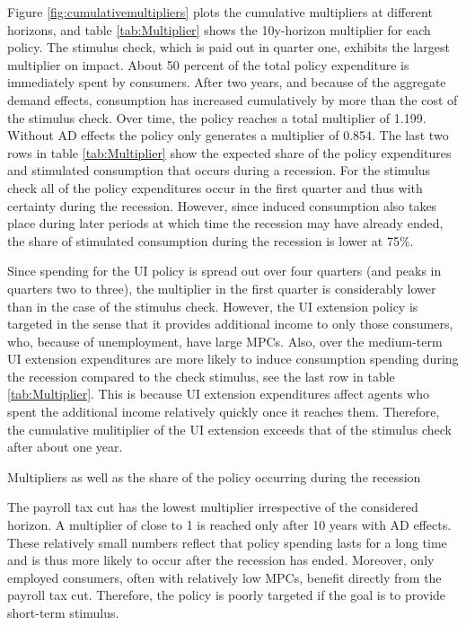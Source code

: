 \documentclass[\econtexRoot/HAFiscal]{subfiles}
\begin{document}
Figure \ref{fig:cumulativemultipliers} plots the cumulative multipliers at different horizons, and table \ref{tab:Multiplier} shows the 10y-horizon multiplier for each policy. The stimulus check, which is paid out in quarter one, exhibits the largest multiplier on impact. About 50 percent of the total policy expenditure is immediately spent by consumers. After two years, and because of the aggregate demand effects, consumption has increased cumulatively by more than the cost of the stimulus check. Over time, the policy reaches a total multiplier of 1.199. Without AD effects the policy only generates a multiplier of 0.854. The last two rows in table \ref{tab:Multiplier} show the expected share of the policy expenditures and stimulated consumption that occurs during a recession. For the stimulus check all of the policy expenditures occur in the first quarter and thus with certainty during the recession. However, since induced consumption also takes place during later periods at which time the recession may have already ended, the share of stimulated consumption during the recession is lower at 75\%.

Since spending for the UI policy is spread out over four quarters (and peaks in quarters two to three), the multiplier in the first quarter is considerably lower than in the case of the stimulus check. However, the UI extension policy is targeted in the sense that it provides additional income to only those consumers, who, because of unemployment, have large MPCs. Also, over the medium-term UI extension expenditures are more likely to induce consumption spending during the recession compared to the check stimulus, see the last row in table \ref{tab:Multiplier}. This is because UI extension expenditures affect agents who spent the additional income relatively quickly once it reaches them. Therefore, the cumulative mulitiplier of the UI extension exceeds that of the stimulus check after about one year.  

\begin{table}[t]
  \center
  
  \caption{Multipliers as well as the share of the policy occurring during the recession}
  \notinsubfile{\label{tab:Multiplier}}
\end{table}

The payroll tax cut has the lowest multiplier irrespective of the considered horizon. A multiplier of close to 1 is reached only after 10 years with AD effects. These relatively small numbers reflect that policy spending lasts for a long time and is thus more likely to occur after the recession has ended. Moreover, only employed consumers, often with relatively low MPCs, benefit directly from the payroll tax cut. Therefore, the policy is poorly targeted if the goal is to provide short-term stimulus.
\end{document}
